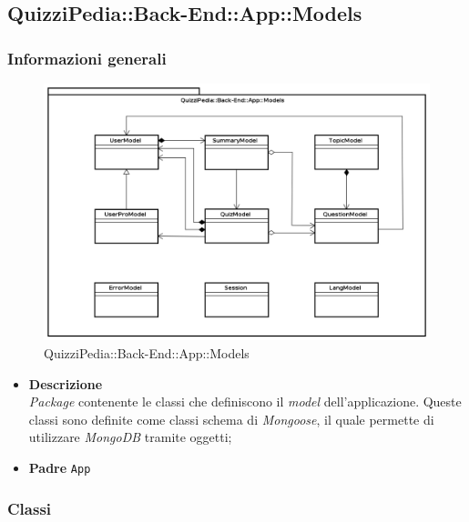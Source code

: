 \subsection{QuizziPedia::Back-End::App::Models}
\subsubsection{Informazioni generali}
\label{QuizziPedia::Back-End::App::Models}
\begin{figure}[ht]
	\centering
	\includegraphics[scale=0.45]{UML/Package/QuizziPedia_Back-End_App_Models.png}
	\caption{QuizziPedia::Back-End::App::Models}
\end{figure}
\FloatBarrier
\begin{itemize}
	\item \textbf{Descrizione} \\
	\textit{Package} contenente le classi che definiscono il \textit{model} dell'applicazione. Queste classi sono definite come classi schema di \textit{Mongoose}, il quale permette di utilizzare \textit{MongoDB} tramite oggetti;
	\item \textbf{Padre} \texttt{App}
\end{itemize}

\subsubsection{Classi}








